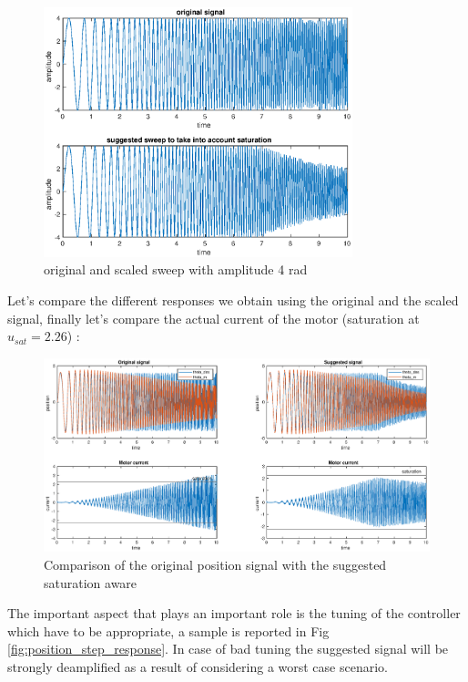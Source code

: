 \documentclass[a4paper,11pt]{article}
\begin{document}
\begin{figure}[H]
\begin{center}
\includegraphics[width=0.8\textwidth]{images/position_scaled.eps}
\end{center}
\caption{original and scaled sweep with amplitude 4 rad}
\label{fig:position_ref}
\end{figure}

\noindent Let's compare the different responses we obtain using the original and the scaled signal, finally let's compare the actual current of the motor (saturation at $u_{sat} = 2.26$) :

\begin{figure}[H]
\begin{center}
\hspace*{-5cm}
\includegraphics[width=1.6\textwidth]{images/position_tau.eps}
\end{center}
\caption{Comparison of the original position signal with the suggested saturation aware}
\label{fig:position_tau}
\end{figure}

\noindent The important aspect that plays an important role is the tuning of the controller which have to be appropriate, a sample is reported in Fig \ref{fig:position_step_response}. In case of bad tuning the suggested signal will be strongly deamplified as a result of considering a worst case scenario.
\end{document}
